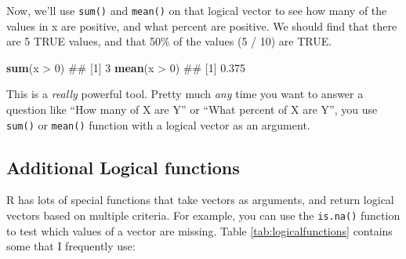 \documentclass[]{book}
\newenvironment{Shaded}{\begin{snugshade}}{\end{snugshade}}
\newcommand{\KeywordTok}[1]{\textcolor[rgb]{0.13,0.29,0.53}{\textbf{{#1}}}}
\newcommand{\DecValTok}[1]{\textcolor[rgb]{0.00,0.00,0.81}{{#1}}}
\newcommand{\StringTok}[1]{\textcolor[rgb]{0.31,0.60,0.02}{{#1}}}
\newcommand{\NormalTok}[1]{{#1}}
\theoremstyle{definition}
\theoremstyle{definition}
\theoremstyle{remark}
\begin{document}
Now, we'll use \texttt{sum()} and \texttt{mean()} on that logical vector
to see how many of the values in x are positive, and what percent are
positive. We should find that there are 5 TRUE values, and that 50\% of
the values (5 / 10) are TRUE.

\begin{Shaded}
\begin{Highlighting}[]
\KeywordTok{sum}\NormalTok{(x >}\StringTok{ }\DecValTok{0}\NormalTok{)}
\NormalTok{## [1] 3}
\KeywordTok{mean}\NormalTok{(x >}\StringTok{ }\DecValTok{0}\NormalTok{)}
\NormalTok{## [1] 0.375}
\end{Highlighting}
\end{Shaded}

This is a \emph{really} powerful tool. Pretty much \emph{any} time you
want to answer a question like ``How many of X are Y'' or ``What percent
of X are Y'', you use \texttt{sum()} or \texttt{mean()} function with a
logical vector as an argument.

\subsection{Additional Logical
functions}\label{additional-logical-functions}

R has lots of special functions that take vectors as arguments, and
return logical vectors based on multiple criteria. For example, you can
use the \texttt{is.na()} function to test which values of a vector are
missing. Table \ref{tab:logicalfunctions} contains some that I
frequently use:
\end{document}
